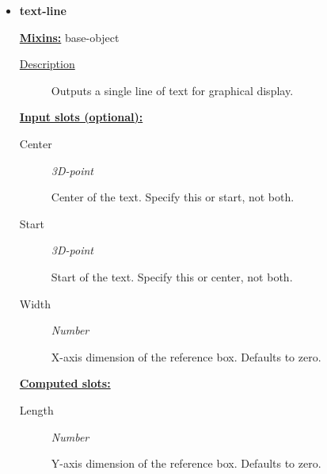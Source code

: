\documentclass [11pt]{book}
\begin{document}
\begin{itemize}
\item {}
\label{prim:text-line}
\textbf{text-line}


\textbf{
\underline{Mixins:}} base-object





\begin{description}

\item [
\underline{Description}]


Outputs a single line of text for graphical display.



\end{description}








\textbf{
\underline{Input slots (optional):}}

\begin{description}

\item [Center]
\emph{3D-point}

 Center of the text. Specify this or start, not both.




\item [Start]
\emph{3D-point}

 Start of the text. Specify this or center, not both.




\item [Width]
\emph{Number}

 X-axis dimension of the reference box. Defaults to zero.




\end{description}






\textbf{
\underline{Computed slots:}}

\begin{description}

\item [Length]
\emph{Number}

 Y-axis dimension of the reference box. Defaults to zero.




\end{description}








\end{itemize}
\end{document}

